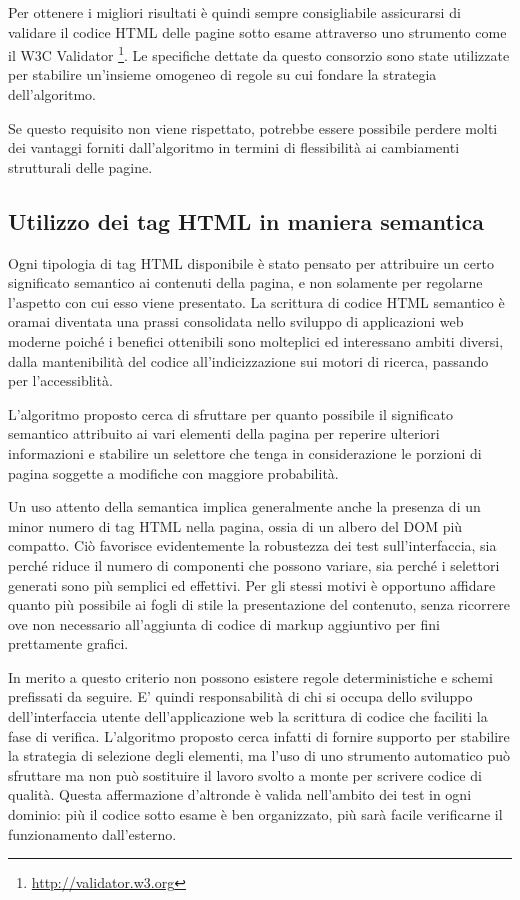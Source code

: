 Per ottenere i migliori risultati è quindi sempre consigliabile assicurarsi di validare il codice HTML delle pagine sotto esame attraverso uno strumento come il W3C Validator \footnote{\url{http://validator.w3.org}}. Le specifiche dettate da questo consorzio sono state utilizzate per stabilire un'insieme omogeneo di regole su cui fondare la strategia dell'algoritmo.

Se questo requisito non viene rispettato, potrebbe essere possibile perdere molti dei vantaggi forniti dall'algoritmo in termini di flessibilità ai cambiamenti strutturali delle pagine.

\subsection {Utilizzo dei tag HTML in maniera semantica}

Ogni tipologia di tag HTML disponibile è stato pensato per attribuire un certo significato semantico ai contenuti della pagina, e non solamente per regolarne l'aspetto con cui esso viene presentato. La scrittura di codice HTML semantico è oramai diventata una prassi consolidata nello sviluppo di applicazioni web moderne poiché i benefici ottenibili sono molteplici ed interessano ambiti diversi, dalla mantenibilità del codice all'indicizzazione sui motori di ricerca, passando per l'accessiblità.

L'algoritmo proposto cerca di sfruttare per quanto possibile il significato semantico attribuito ai vari elementi della pagina per reperire ulteriori informazioni e stabilire un selettore che tenga in considerazione le porzioni di pagina soggette a modifiche con maggiore probabilità.

Un uso attento della semantica implica generalmente anche la presenza di un minor numero di tag HTML nella pagina, ossia di un albero del DOM più compatto. Ciò favorisce evidentemente la robustezza dei test sull'interfaccia, sia perché riduce il numero di componenti che possono variare, sia perché i selettori generati sono più semplici ed effettivi. Per gli stessi motivi è opportuno affidare quanto più possibile ai fogli di stile la presentazione del contenuto, senza ricorrere ove non necessario all'aggiunta di codice di markup aggiuntivo per fini prettamente grafici.

In merito a questo criterio non possono esistere regole deterministiche e schemi prefissati da seguire. E' quindi responsabilità di chi si occupa dello sviluppo dell'interfaccia utente dell'applicazione web la scrittura di codice che faciliti la fase di verifica. L'algoritmo proposto cerca infatti di fornire supporto per stabilire la strategia di selezione degli elementi, ma l'uso di uno strumento automatico può sfruttare ma non può sostituire il lavoro svolto a monte per scrivere codice di qualità. Questa affermazione d'altronde è valida nell'ambito dei test in ogni dominio: più il codice sotto esame è ben organizzato, più sarà facile verificarne il funzionamento dall'esterno.

